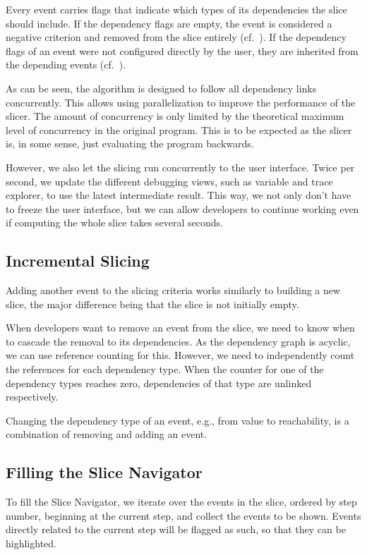 \documentclass[
			english,
			review,
			]{elsarticle}
\begin{document}
Every event carries flags that indicate which types of its dependencies the slice should include.
If the dependency flags are empty, the event is considered a negative criterion and removed from the slice entirely (cf.~).
If the dependency flags of an event were not configured directly by the user, they are inherited from the depending events (cf.~).

As can be seen, the algorithm is designed to follow all dependency links concurrently.
This allows using parallelization to improve the performance of the slicer.
The amount of concurrency is only limited by the theoretical maximum level of concurrency in the original program.
This is to be expected as the slicer is, in some sense, just evaluating the program backwards.

However, we also let the slicing run concurrently to the user interface.
Twice per second, we update the different debugging views, such as variable and trace explorer, to use the latest intermediate result.
This way, we not only don't have to freeze the user interface, but we can allow developers to continue working even if computing the whole slice takes several seconds.

\subsection{Incremental Slicing}

Adding another event to the slicing criteria works similarly to building a new slice, the major difference being that the slice is not initially empty.

When developers want to remove an event from the slice, we need to know when to cascade the removal to its dependencies.
As the dependency graph is acyclic, we can use reference counting for this.
However, we need to independently count the references for each dependency type.
When the counter for one of the dependency types reaches zero, dependencies of that type are unlinked respectively.

Changing the dependency type of an event, e.g., from value to reachability, is a combination of removing and adding an event.

\subsection{Filling the Slice Navigator}

To fill the Slice Navigator, we iterate over the events in the slice, ordered by step number, beginning at the current step, and collect the events to be shown.
Events directly related to the current step will be flagged as such, so that they can be highlighted.
\end{document}
